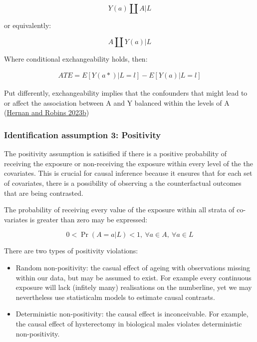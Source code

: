 \documentclass[
  singlecolumn]{report}
\begin{document}
\[Y(a)\coprod  A|L\]

or equivalently:

\[A \coprod  Y(a)|L\]

Where conditional exchangeability holds, then:

\[
\begin{aligned}
ATE = E[Y(a*)|L = l] - E[Y(a)|L = l] 
\end{aligned}
\]

Put differently, exchangeability implies that the confounders that might
lead to or affect the association between A and Y balanced within the
levels of A (\protect\hyperlink{ref-hernan2023a}{Hernan and Robins
2023b})

\hypertarget{identification-assumption-3-positivity}{%
\subsubsection{Identification assumption 3:
Positivity}\label{identification-assumption-3-positivity}}

The positivity assumption is satisified if there is a positive
probability of receiving the exposure or non-receiving the exposure
within every level of the the covariates. This is crucial for causal
inference because it ensures that for each set of covariates, there is a
possibility of observing a the counterfactual outcomes that are being
contrasted.

The probability of receiving every value of the exposure within all
strata of co-variates is greater than zero may be expressed:

\begin{equation}
0 < \Pr(A=a|L)<1, ~ \forall a \in A, ~ \forall a \in L
\end{equation}

There are two types of positivity violations:

\begin{itemize}
\item
  Random non-positivity: the casual effect of ageing with observations
  missing within our data, but may be assumed to exist. For example
  every continuous exposure will lack (infitely many) realisations on
  the numberline, yet we may nevertheless use statisticalm models to
  estimate causal contrasts.
\item
  Deterministic non-positivity: the causal effect is inconceivable. For
  example, the causal effect of hysterectomy in biological males
  violates deterministic non-positivity.
\end{itemize}
\end{document}
